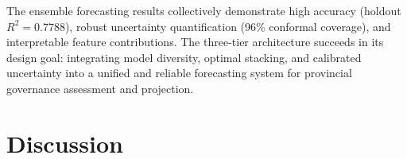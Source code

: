 \documentclass[12pt,a4paper]{article}
\begin{document}
\FloatBarrier

The ensemble forecasting results collectively demonstrate high accuracy (holdout $R^2 = 0.7788$), robust uncertainty quantification (96\% conformal coverage), and interpretable feature contributions. The three-tier architecture succeeds in its design goal: integrating model diversity, optimal stacking, and calibrated uncertainty into a unified and reliable forecasting system for provincial governance assessment and projection.

\section{Discussion}
\label{sec:discussion}
\end{document}
